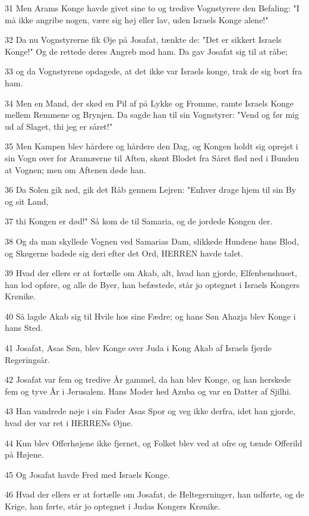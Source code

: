 \par 31 Men Arams Konge havde givet sine to og tredive Vognstyrere den Befaling: "I må ikke angribe nogen, være sig høj eller lav, uden Israels Konge alene!"
\par 32 Da nu Vognstyrerne fik Øje på Josafat, tænkte de: "Det er sikkert Israels Konge!" Og de rettede deres Angreb mod ham. Da gav Josafat sig til at råbe;
\par 33 og da Vognstyrene opdagede, at det ikke var Israels konge, trak de sig bort fra ham.
\par 34 Men en Mand, der skød en Pil af på Lykke og Fromme, ramte Israels Konge mellem Remmene og Brynjen. Da sagde han til sin Vognstyrer: "Vend og før mig ud af Slaget, thi jeg er såret!"
\par 35 Men Kampen blev hårdere og hårdere den Dag, og Kongen holdt sig oprejst i sin Vogn over for Aramæerne til Aften, skønt Blodet fra Såret flød ned i Bunden at Vognen; men om Aftenen døde han.
\par 36 Da Solen gik ned, gik det Råb gennem Lejren: "Enhver drage hjem til sin By og sit Land,
\par 37 thi Kongen er død!" Så kom de til Samaria, og de jordede Kongen der.
\par 38 Og da man skyllede Vognen ved Samarias Dam, slikkede Hundene hans Blod, og Skøgerne badede sig deri efter det Ord, HERREN havde talet.
\par 39 Hvad der ellers er at fortælle om Akab, alt, hvad han gjorde, Elfenbenshuset, han lod opføre, og alle de Byer, han befæstede, står jo optegnet i Israels Kongers Krønike.
\par 40 Så lagde Akab sig til Hvile hos sine Fædre; og hans Søn Ahazja blev Konge i hans Sted.
\par 41 Josafat, Asas Søn, blev Konge over Juda i Kong Akab af Israels fjerde Regeringsår.
\par 42 Josafat var fem og tredive År gammel, da han blev Konge, og han herskede fem og tyve År i Jerusalem. Hans Moder hed Azuba og var en Datter af Sjilhi.
\par 43 Han vandrede nøje i sin Fader Asas Spor og veg ikke derfra, idet han gjorde, hvad der var ret i HERRENs Øjne.
\par 44 Kun blev Offerhøjene ikke fjernet, og Folket blev ved at ofre og tænde Offerild på Højene.
\par 45 Og Josafat havde Fred med Israels Konge.
\par 46 Hvad der ellers er at fortælle om Josafat, de Heltegerninger, han udførte, og de Krige, han førte, står jo optegnet i Judas Kongers Krønike.
